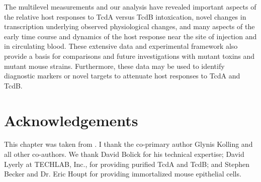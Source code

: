 The multilevel measurements and our analysis have revealed 
important aspects of the relative host responses to TcdA versus 
TcdB intoxication, novel changes in transcription underlying 
observed physiological changes, and many aspects of the early 
time course and dynamics of the host response near the site of 
injection and in circulating blood. These extensive data and 
experimental framework also provide a basis for comparisons and 
future investigations with mutant toxins and mutant mouse strains. 
Furthermore, these data may be used to identify diagnostic markers 
or novel targets to attenuate host responses to TcdA and TcdB. 

\section{Acknowledgements}
This chapter was taken from .
I thank the co-primary author Glynis Kolling and all other co-authors.
We thank David Bolick for his technical expertise; David Lyerly 
at TECHLAB, Inc., for providing purified TcdA and TcdB; and Stephen 
Becker and Dr. Eric Houpt for providing immortalized mouse epithelial cells.


